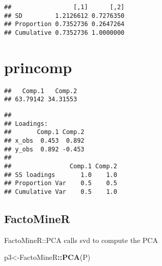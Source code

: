 \documentclass[]{article}
\newenvironment{Shaded}{\begin{snugshade}}{\end{snugshade}}
\newcommand{\KeywordTok}[1]{\textcolor[rgb]{0.13,0.29,0.53}{\textbf{#1}}}
\newcommand{\CommentTok}[1]{\textcolor[rgb]{0.56,0.35,0.01}{\textit{#1}}}
\newcommand{\OperatorTok}[1]{\textcolor[rgb]{0.81,0.36,0.00}{\textbf{#1}}}
\newcommand{\NormalTok}[1]{#1}
\begin{document}
\begin{verbatim}
##                 [,1]      [,2]
## SD         1.2126612 0.7276350
## Proportion 0.7352736 0.2647264
## Cumulative 0.7352736 1.0000000
\end{verbatim}

\hypertarget{princomp}{%
\section{princomp}\label{princomp}}

\begin{Shaded}
\end{Shaded}

\begin{verbatim}
##   Comp.1   Comp.2 
## 63.79142 34.31553
\end{verbatim}

\begin{Shaded}
\end{Shaded}

\begin{verbatim}
## 
## Loadings:
##       Comp.1 Comp.2
## x_obs  0.453  0.892
## y_obs  0.892 -0.453
## 
##                Comp.1 Comp.2
## SS loadings       1.0    1.0
## Proportion Var    0.5    0.5
## Cumulative Var    0.5    1.0
\end{verbatim}

\hypertarget{factominer}{%
\subsection{FactoMineR}\label{factominer}}

FactoMineR::PCA calls svd to compute the PCA

\begin{Shaded}
\begin{Highlighting}[]
\NormalTok{p3<-FactoMineR}\OperatorTok{::}\KeywordTok{PCA}\NormalTok{(P)}
\end{Highlighting}
\end{Shaded}
\end{document}
